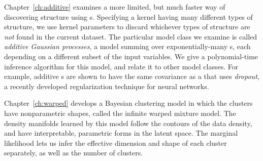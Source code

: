 Chapter~\ref{ch:additive} examines a more limited, but much faster way of discovering structure using \gp{}s.
Specifying a kernel having many different types of structure, we use kernel parameters to discard whichever types of structure are \emph{not} found in the current dataset.
The particular model class we examine is called \emph{additive Gaussian processes}, a model summing over exponentially-many \gp{}s, each depending on a different subset of the input variables.
We give a polynomial-time inference algorithm for this model, and relate it to other model classes.
For example, additive \gp{}s are shown to have the same covariance as a \gp{} that uses \emph{dropout}, a recently developed regularization technique for neural networks.

Chapter~\ref{ch:warped} develops a Bayesian clustering model in which the clusters have nonparametric shapes, called the infinite warped mixture model.
The density manifolds learned by this model follow the contours of the data density, and have interpretable, parametric forms in the latent space.
The marginal likelihood lets us infer the effective dimension and shape of each cluster separately, as well as the number of clusters.

\outbpdocument{


}


